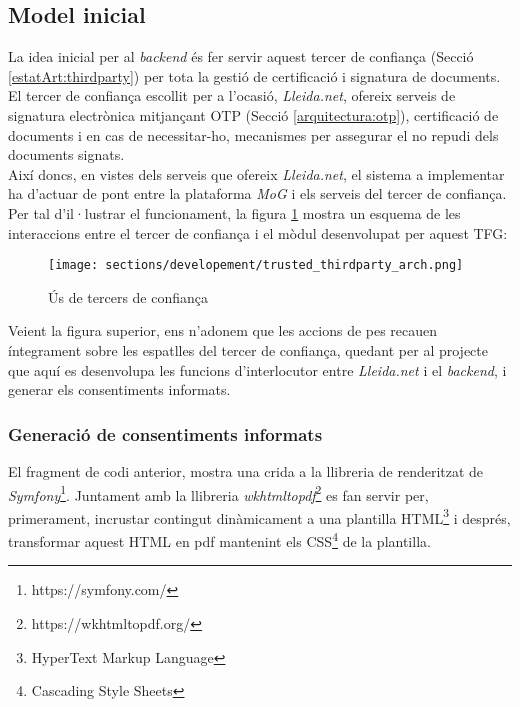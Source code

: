 \subsection{Model inicial}
La idea inicial per al \textit{backend} és fer servir aquest tercer de confiança (Secció \ref{estatArt:thirdparty}) per tota la gestió de certificació i signatura de documents.\\
\newline El tercer de confiança escollit per a l'ocasió, \textit{Lleida.net}, ofereix serveis de signatura electrònica mitjançant OTP (Secció \ref{arquitectura:otp}), certificació de documents i en cas de necessitar-ho, mecanismes per assegurar el no repudi dels documents signats.\\
\newline Així doncs, en vistes dels serveis que ofereix \textit{Lleida.net}, el sistema a implementar ha d'actuar de pont entre la plataforma \textit{MoG} i els serveis del tercer de confiança.\\
\newline Per tal d'il·lustrar el funcionament, la figura \ref{fig:thirdparty_usage} mostra un esquema de les interaccions entre el tercer de confiança i el mòdul desenvolupat per aquest TFG:
\begin{figure}[h]
\texttt{[image: sections/developement/trusted\_thirdparty\_arch.png]}
\centering
\caption{Ús de tercers de confiança}
\label{fig:thirdparty_usage}
\end{figure}
\newline Veient la figura superior, ens n'adonem que les accions de pes recauen íntegrament sobre les espatlles del tercer de confiança, quedant per al projecte que aquí es desenvolupa les funcions d'interlocutor entre \textit{Lleida.net} i el \textit{backend}, i generar els consentiments informats.
\subsubsection{Generació de consentiments informats}
El fragment de codi anterior, mostra una crida a la llibreria de renderitzat de \textit{Symfony}\footnote{https://symfony.com/}. Juntament amb la llibreria \textit{wkhtmltopdf}\footnote{https://wkhtmltopdf.org/} es fan servir per, primerament, incrustar contingut dinàmicament a una plantilla HTML\footnote{HyperText Markup Language} i després, transformar aquest HTML en pdf mantenint els CSS\footnote{Cascading Style Sheets} de la plantilla.
